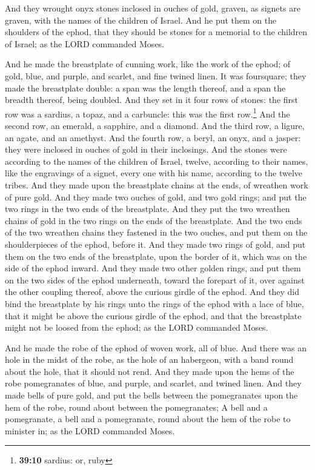  And they wrought onyx stones inclosed in ouches of gold,
graven, as signets are graven, with the names of the children of Israel.
 And he put them on the shoulders of the ephod, that they
should be stones for a memorial to the children of Israel; as the LORD
commanded Moses.

 And he made the breastplate of cunning work, like the
work of the ephod; of gold, blue, and purple, and scarlet, and fine
twined linen.  It was foursquare; they made the
breastplate double: a span was the length thereof, and a span the
breadth thereof, being doubled.  And they set in it four
rows of stones: the first row was a sardius, a topaz, and a carbuncle:
this was the first row.\footnote{\textbf{39:10} sardius: or, ruby}
 And the second row, an emerald, a sapphire, and a
diamond.  And the third row, a ligure, an agate, and an
amethyst.  And the fourth row, a beryl, an onyx, and a
jasper: they were inclosed in ouches of gold in their inclosings.
 And the stones were according to the names of the
children of Israel, twelve, according to their names, like the
engravings of a signet, every one with his name, according to the twelve
tribes.  And they made upon the breastplate chains at the
ends, of wreathen work of pure gold.  And they made two
ouches of gold, and two gold rings; and put the two rings in the two
ends of the breastplate.  And they put the two wreathen
chains of gold in the two rings on the ends of the breastplate.
 And the two ends of the two wreathen chains they
fastened in the two ouches, and put them on the shoulderpieces of the
ephod, before it.  And they made two rings of gold, and
put them on the two ends of the breastplate, upon the border of it,
which was on the side of the ephod inward.  And they made
two other golden rings, and put them on the two sides of the ephod
underneath, toward the forepart of it, over against the other coupling
thereof, above the curious girdle of the ephod.  And they
did bind the breastplate by his rings unto the rings of the ephod with a
lace of blue, that it might be above the curious girdle of the ephod,
and that the breastplate might not be loosed from the ephod; as the LORD
commanded Moses.

 And he made the robe of the ephod of woven work, all of
blue.  And there was an hole in the midst of the robe, as
the hole of an habergeon, with a band round about the hole, that it
should not rend.  And they made upon the hems of the robe
pomegranates of blue, and purple, and scarlet, and twined linen.
 And they made bells of pure gold, and put the bells
between the pomegranates upon the hem of the robe, round about between
the pomegranates;  A bell and a pomegranate, a bell and a
pomegranate, round about the hem of the robe to minister in; as the LORD
commanded Moses.

